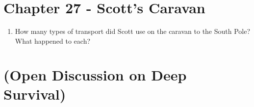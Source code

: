 \documentclass{article}
\begin{document}
\section{Chapter 27 - Scott's Caravan}

\begin{enumerate}
\item How many types of transport did Scott use on the caravan to the South Pole?  What happened to each? \\ \vspace{2cm}
\end{enumerate}

\section{(Open Discussion on Deep Survival)}
\end{document}
